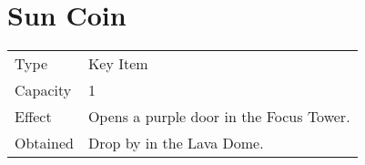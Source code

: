 \section{Sun Coin}
\label{item:sun_coin}


\noindent\begin{tabularx}{\textwidth}[l]{lX}
	Type
	& Key Item
\\ %
	Capacity
	& 1
\\ %
	Effect
	& Opens a purple door in the Focus Tower.
\\ %
	Obtained
	& Drop by \nameref{monster:dualhead_hydra} in the Lava Dome.
\end{tabularx}
